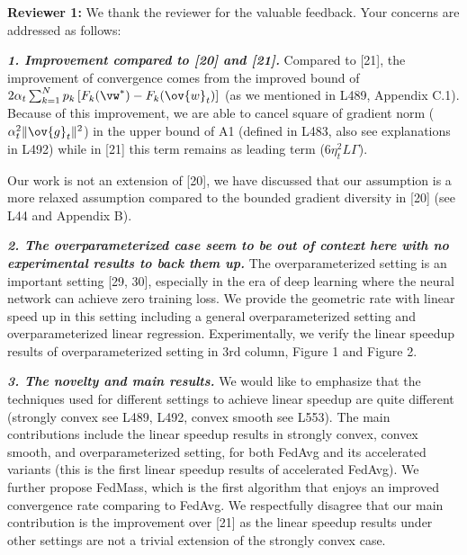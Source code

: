 {\color{blue}\textbf{Reviewer 1:}} We thank the reviewer for the valuable feedback. Your concerns are addressed as follows: 

\textbf{\textit{1. Improvement compared to [20] and [21].}} Compared to [21], the improvement 
of convergence comes from the improved bound of $2\alpha_{t}\sum_{k=1}^{N}p_{k}\left[F_{k}(\vw^{\ast})-F_{k}(\ov{w}_{t})\right]$ (as we mentioned in L489, Appendix C.1). Because of this improvement, we are able to cancel square of gradient norm ($\alpha_{t}^{2}\|\ov{g}_{t}\|^{2}$) in the upper bound of A1 (defined in L483, also see explanations in L492) while in [21] this term remains as leading term ($6\eta_t^2L \Gamma$). 

Our work is not an extension of [20], we have discussed that our assumption is
a more relaxed assumption compared to the bounded gradient diversity in [20] (see L44 and Appendix B). 

\textbf{\textit{2. The overparameterized case seem to be out of context here with no experimental results to back them up.}} The overparameterized 
setting is an important setting [29, 30], especially in the era of deep learning
where the neural network can achieve zero training loss. We provide the 
geometric rate with linear speed up in this setting including a general overparameterized setting and overparameterized linear regression. 
Experimentally, we verify the linear speedup results of overparameterized setting in 3rd column, Figure 1 and Figure 2. 

\textbf{\textit{3. The novelty and main results.}}
We would like to emphasize that the techniques used for different settings
to achieve linear speedup are quite different (strongly convex see L489, L492, convex smooth see L553). The main contributions include
the linear speedup results in strongly convex, convex smooth, and overparameterized
setting, for both FedAvg and its accelerated variants (this is the first linear speedup results of accelerated FedAvg). We further propose FedMass,
which is the first algorithm that enjoys an improved convergence rate comparing to
FedAvg. We respectfully disagree that our main contribution is the improvement over [21] as the linear speedup results under other settings are not a trivial extension of the strongly convex case.

